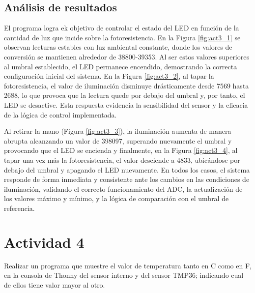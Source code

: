 \documentclass[letterpaper,12pt]{article}
\begin{document}
\subsection*{Análisis de resultados}

El programa logra ek objetivo de controlar el estado del LED en función de la cantidad de luz que incide sobre la fotoresistencia. En la Figura \ref{fig:act3_1} se observan lecturas estables con luz ambiental constante, donde los valores de conversión se mantienen alrededor de 38800-39353. Al ser estos valores superiores al umbral establecido, el LED permanece encendido, demostrando la correcta configuración inicial del sistema. En la Figura \ref{fig:act3_2}, al tapar la fotoresistencia, el valor de iluminación disminuye drásticamente desde 7569 hasta 2688, lo que provoca que la lectura quede por debajo del umbral y, por tanto, el LED se desactive. Esta respuesta evidencia la sensibilidad del sensor y la eficacia de la lógica de control implementada.

Al retirar la mano (Figura \ref{fig:act3_3}), la iluminación aumenta de manera abrupta alcanzando un valor de 398097, superando nuevamente el umbral y provocando que el LED se encienda y finalmente, en la Figura \ref{fig:act3_4}, al tapar una vez más la fotoresistencia, el valor desciende a 4833, ubicándose por debajo del umbral y apagando el LED nuevamente. En todos los casos, el sistema responde de forma inmediata y consistente ante los cambios en las condiciones de iluminación, validando el correcto funcionamiento del ADC, la actualización de los valores máximo y mínimo, y la lógica de comparación con el umbral de referencia.


    \newpage
    \section*{Actividad 4}

    Realizar un programa que muestre el valor de temperatura tanto en C como en F, en la consola de Thonny del sensor interno y del sensor TMP36; indicando cual de ellos tiene valor mayor al otro.
\end{document}
